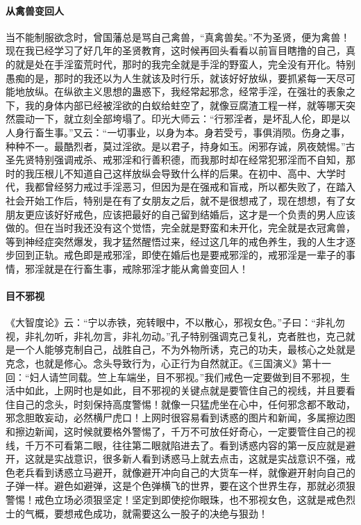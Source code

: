 \paragraph{从禽兽变回人}

当不能制服欲念时，曾国藩总是骂自己禽兽，“真禽兽矣。”不为圣贤，便为禽兽！现在我已经学习了好几年的圣贤教育，这时候再回头看看以前盲目瞎撸的自己，真的就是处在手淫蛮荒时代，那时的我完全就是手淫的野蛮人，完全没有开化。特别愚痴的是，那时的我还以为人生就该及时行乐，就该好好放纵，要抓紧每一天尽可能地放纵。在纵欲主义思想的蛊惑下，我经常起邪念，经常手淫，在强壮的表象之下，我的身体内部已经被淫欲的白蚁给蛀空了，就像豆腐渣工程一样，就等哪天突然震动一下，就立刻全部垮塌了。印光大师云：“行邪淫者，是坏乱人伦，即是以人身行畜生事。”又云：“一切事业，以身为本。身若受亏，事俱消陨。伤身之事，种种不一。最酷烈者，莫过淫欲。是以君子，持身如玉。闲邪存诚，夙夜兢惕。”古圣先贤特别强调戒杀、戒邪淫和行善积德，而我那时却在经常犯邪淫而不自知，那时的我压根儿不知道自己这样放纵会导致什么样的后果。在初中、高中、大学时代，我都曾经努力戒过手淫恶习，但因为是在强戒和盲戒，所以都失败了，在踏入社会开始工作后，特别是在有了女朋友之后，就不是很想戒了，现在想想，有了女朋友更应该好好戒色，应该把最好的自己留到结婚后，这才是一个负责的男人应该做的。但在当时我还没有这个觉悟，完全就是野蛮和未开化，完全就是衣冠禽兽，等到神经症突然爆发，我才猛然醒悟过来，经过这几年的戒色养生，我的人生才逐步回到正轨。戒色即是戒邪淫，即使在婚后也是要戒邪淫的，戒邪淫是一辈子的事情，邪淫就是在行畜生事，戒除邪淫才能从禽兽变回人！

\paragraph{目不邪视}

《大智度论》云：“宁以赤铁，宛转眼中，不以散心，邪视女色。”子曰：“非礼勿视，非礼勿听，非礼勿言，非礼勿动。”孔子特别强调克己复礼，克者胜也，克己就是一个人能够克制自己，战胜自己，不为外物所诱，克己的功夫，最核心之处就是克念，也就是修心。念头导致行为，心正行为自然就正。《三国演义》第十一回：“妇人请竺同载。竺上车端坐，目不邪视。”我们戒色一定要做到目不邪视，生活中如此，上网时也是如此，目不邪视的关键点就是要管住自己的视线，并且要看住自己的念头，时刻保持高度警惕！就像一只猛虎坐在心中，任何邪念都不敢动，邪念胆敢妄动，必然横尸虎口！上网时很容易看到诱惑的图片和新闻，多属擦边图和擦边新闻，这时候就要格外警惕了，千万不可放任好奇心，一定要管住自己的视线，千万不可看第二眼，往往第二眼就陷进去了。看到诱惑内容的第一反应就是避开，这就是实战意识，很多新人看到诱惑马上就去点击，这就是实战意识不强，戒色老兵看到诱惑立马避开，就像避开冲向自己的大货车一样，就像避开射向自己的子弹一样。避色如避弹，这是个色弹横飞的世界，要在这个世界生存，那就必须狠警惕！戒色立场必须狠坚定！坚定到即使挖你眼珠，也不邪视女色，这就是戒色烈士的气概，要想戒色成功，就需要这么一股子的决绝与狠劲！

